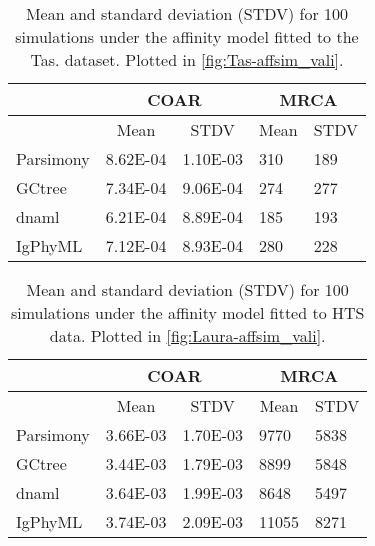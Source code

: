 \begin{table}[!ht]
\centering
\begin{tabular}{|l|l|l|l|l|}
\hline
 & \multicolumn{2}{c|}{COAR}                             & \multicolumn{2}{c|}{MRCA}                             \\ \hline
                 & \multicolumn{1}{c|}{Mean} & \multicolumn{1}{c|}{STDV} & \multicolumn{1}{c|}{Mean} & \multicolumn{1}{c|}{STDV} \\ \hline
Parsimony        & 8.62E-04                  & 1.10E-03                  & 310                       & 189                       \\ \hline
GCtree           & 7.34E-04                  & 9.06E-04                  & 274                       & 277                       \\ \hline
dnaml            & 6.21E-04                  & 8.89E-04                  & 185                       & 193                       \\ \hline
IgPhyML          & 7.12E-04                  & 8.93E-04                  & 280                       & 228                       \\ \hline
\end{tabular}
\caption{
\label{tab:Tas-affsim_vali}
Mean and standard deviation (STDV) for 100 simulations under the affinity model fitted to the Tas. dataset. Plotted in \ref{fig:Tas-affsim_vali}.
}
\end{table}


\begin{table}[!ht]
\centering
\begin{tabular}{|l|l|l|l|l|}
\hline
 & \multicolumn{2}{c|}{COAR}                             & \multicolumn{2}{c|}{MRCA}                             \\ \hline
                 & \multicolumn{1}{c|}{Mean} & \multicolumn{1}{c|}{STDV} & \multicolumn{1}{c|}{Mean} & \multicolumn{1}{c|}{STDV} \\ \hline
Parsimony        & 3.66E-03                  & 1.70E-03                  & 9770                      & 5838                      \\ \hline
GCtree           & 3.44E-03                  & 1.79E-03                  & 8899                      & 5848                      \\ \hline
dnaml            & 3.64E-03                  & 1.99E-03                  & 8648                      & 5497                      \\ \hline
IgPhyML          & 3.74E-03                  & 2.09E-03                  & 11055                     & 8271                      \\ \hline
\end{tabular}
\caption{
\label{tab:Laura-affsim_vali}
Mean and standard deviation (STDV) for 100 simulations under the affinity model fitted to HTS data. Plotted in \ref{fig:Laura-affsim_vali}.
}
\end{table}






\vfill
\clearpage
\newpage

